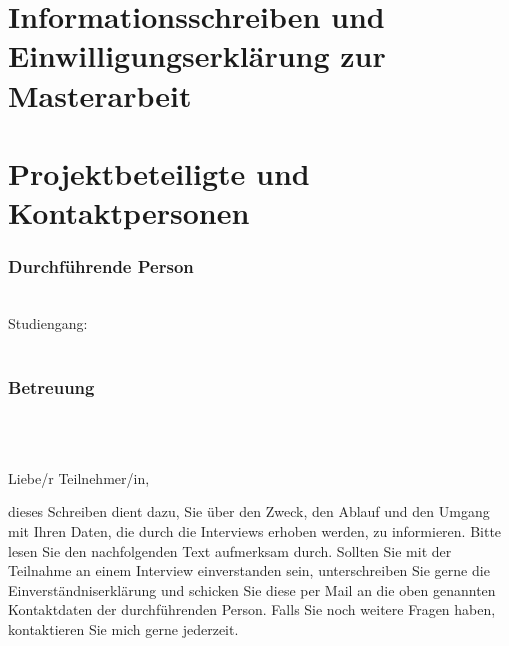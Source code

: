 \documentclass[11pt,a4paper]{article}
\begin{document}
\section*{Informationsschreiben und Einwilligungserklärung zur Masterarbeit}

\begin{center}
\TextField[name=titel,width=17cm,charsize=17pt,multiline=true,default={Titel Ihrer Arbeit}]{}
\end{center}

\section*{Projektbeteiligte und Kontaktpersonen}

\subsubsection*{Durchführende Person}
\TextField[name=name,width=17cm,default={Vorname Name}]{}\\
Studiengang: \TextField[name=studiengang,width=6cm,default={Medizininformatik M. Sc.}]{} \\
\TextField[name=email,width=17cm,default={...@studserv.uni-leipzig.de}]{} \\

\subsubsection*{Betreuung}
\TextField[name=betreuer,width=17cm,default={Titel Vorname Nachname Betreuer:in}]{}\\
\TextField[name=inst,width=17cm,default={Institut für Medizinische Informatik, Statistik und Epidemiologie}]{}
\TextField[name=uni,width=17cm,default={Universität Leipzig}]{}
\TextField[name=emailbet,width=17cm,default={Email-Adresse Betreuer:in}]{} \\

\vspace{2em}

Liebe/r Teilnehmer/in,

dieses Schreiben dient dazu, Sie über den Zweck, den Ablauf und den Umgang mit Ihren Daten, die durch die Interviews erhoben werden, zu informieren.
Bitte lesen Sie den nachfolgenden Text aufmerksam durch.
Sollten Sie mit der Teilnahme an einem Interview einverstanden sein, unterschreiben Sie gerne die Einverständniserklärung und schicken Sie diese per Mail an die oben genannten Kontaktdaten der durchführenden Person.
Falls Sie noch weitere Fragen haben, kontaktieren Sie mich gerne jederzeit.
\end{document}

